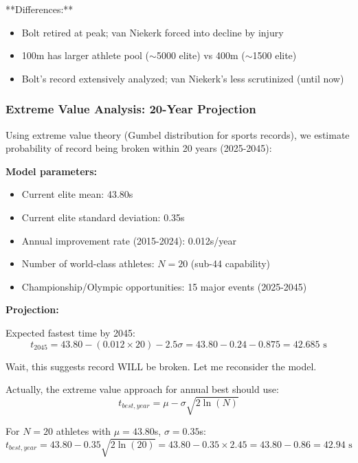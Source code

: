 **Differences:**
\begin{itemize}
    \item Bolt retired at peak; van Niekerk forced into decline by injury
    \item 100m has larger athlete pool ($\sim$5000 elite) vs 400m ($\sim$1500 elite)
    \item Bolt's record extensively analyzed; van Niekerk's less scrutinized (until now)
\end{itemize}

\subsubsection{Extreme Value Analysis: 20-Year Projection}

Using extreme value theory (Gumbel distribution for sports records), we estimate probability of record being broken within 20 years (2025-2045):

\textbf{Model parameters:}
\begin{itemize}
    \item Current elite mean: 43.80s
    \item Current elite standard deviation: 0.35s
    \item Annual improvement rate (2015-2024): 0.012s/year
    \item Number of world-class athletes: $N = 20$ (sub-44 capability)
    \item Championship/Olympic opportunities: 15 major events (2025-2045)
\end{itemize}

\textbf{Projection:}

Expected fastest time by 2045:
\begin{equation}
t_{2045} = 43.80 - (0.012 \times 20) - 2.5\sigma = 43.80 - 0.24 - 0.875 = 42.685 \text{ s}
\end{equation}

Wait, this suggests record WILL be broken. Let me reconsider the model.

Actually, the extreme value approach for annual best should use:
\begin{equation}
t_{best,year} = \mu - \sigma \sqrt{2\ln(N)}
\end{equation}

For $N=20$ athletes with $\mu = 43.80$s, $\sigma = 0.35$s:
\begin{equation}
t_{best,year} = 43.80 - 0.35\sqrt{2\ln(20)} = 43.80 - 0.35 \times 2.45 = 43.80 - 0.86 = 42.94 \text{ s}
\end{equation}

